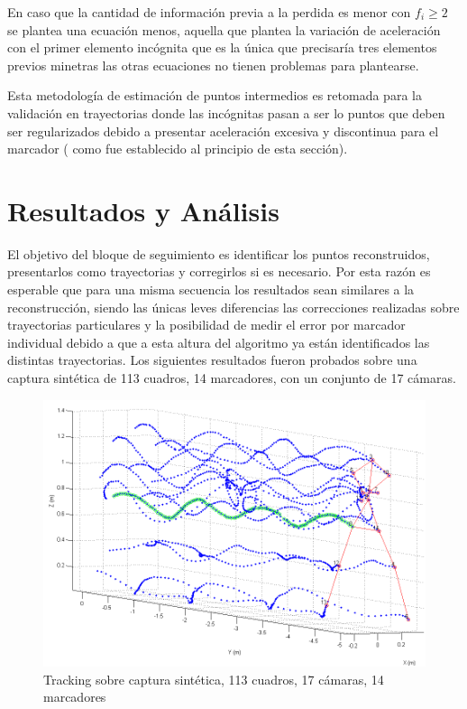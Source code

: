 En caso que la cantidad de información previa a la perdida es menor con $f_{i} \geq 2$ se plantea una ecuación menos, aquella que plantea la variación de aceleración con el primer elemento incógnita que es la única que precisaría tres elementos previos minetras las otras ecuaciones no tienen problemas para plantearse.

Esta metodología de estimación de puntos intermedios es retomada para la validación en trayectorias donde las incógnitas pasan a ser lo puntos que deben ser regularizados debido a presentar aceleración excesiva y discontinua para el marcador ( como fue establecido al principio de esta sección).




\section{Resultados y Análisis}

El objetivo del bloque de seguimiento es identificar los puntos reconstruidos, presentarlos como trayectorias y corregirlos si es necesario. Por esta razón es esperable que para una misma secuencia los resultados sean similares a la reconstrucción, siendo las únicas leves diferencias las correcciones realizadas sobre trayectorias particulares y la posibilidad de medir el error por marcador individual debido a que a esta altura del algoritmo ya están identificados las distintas trayectorias. Los siguientes resultados fueron probados sobre una captura sintética de 113 cuadros, 14 marcadores, con un conjunto de 17 cámaras.

\begin{figure}[ht!]
\vspace{-0.4cm}
\begin{center}
\includegraphics[scale=0.5]{img/Tracking/040_Salida_Tracking_Esqueleto_Trayectoria.png}
\end{center}
\vspace{-0.5cm}
\caption{Tracking sobre captura sintética, 113 cuadros, 17 cámaras, 14 marcadores}
\label{Tracking_Esqueleto_Trayectoria}
\end{figure}



